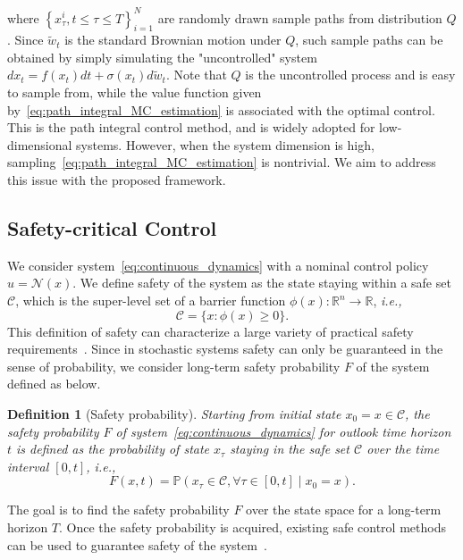 \documentclass[letterpaper]{article} %
\newcommand{\ie}{\textit{i.e., }}
\newcommand{\pr}{\mathbb{P}}
\newcommand{\safe}{\mathcal{C}}
\newtheorem{definition}[theorem]{Definition}
\begin{document}
where $\left\{x_{\tau}^{i}, t \leq \tau \leq T\right\}_{i=1}^{N}$ are randomly drawn sample paths from distribution $Q$.
Since $\tilde{w}_t$ is the standard Brownian motion under $Q$, such sample paths can be obtained by simply simulating the "uncontrolled" system $dx_t = f(x_t)dt + \sigma(x_t) d\tilde{w}_t$.
Note that $Q$ is the uncontrolled process and is easy to sample from, while the value function given by~\eqref{eq:path_integral_MC_estimation} is associated with the optimal control.
This is the path integral control method, and is widely adopted for low-dimensional systems. However, when the system dimension is high, sampling~\eqref{eq:path_integral_MC_estimation} is nontrivial. We aim to address this issue with the proposed framework.



\subsection{Safety-critical Control}
We consider system~\eqref{eq:continuous_dynamics} with a nominal control policy $u = \mathcal{N}(x)$. We define safety of the system as the state staying within a safe set $\mathcal{C}$, which is the super-level set of a barrier function $\phi(x): \mathbb{R}^n \rightarrow \mathbb{R}$, \ie
\begin{equation}
\label{eq:safe set definition}
    \mathcal{C} = \{x : \phi(x) \geq 0\}.
\end{equation}
This definition of safety can characterize a large variety of practical safety requirements~\cite{prajna2007framework, ames2019control}. Since in stochastic systems safety can only be guaranteed in the sense of probability, we consider long-term safety probability $F$ of the system defined as below.
\begin{definition}[Safety probability]
\label{def:safety probability}
Starting from initial state $x_0 = x \in \safe$, the safety probability $F$ of system~\eqref{eq:continuous_dynamics} for outlook time horizon $t$ is defined as the probability of state $x_\tau$ staying in the safe set $\safe$ over the time interval $[0,t]$, i.e.,
\begin{equation}
    F(x,t) = \pr(x_\tau \in \safe, \forall \tau\in [0,t] \mid x_0 =x).
\end{equation}
\end{definition}
The goal is to find the safety probability $F$ over the state space for a long-term horizon $T$. Once the safety probability is acquired, existing safe control methods can be used to guarantee safety of the system~\cite{wang2021myopically,jing2022probabilistic}.
\end{document}
